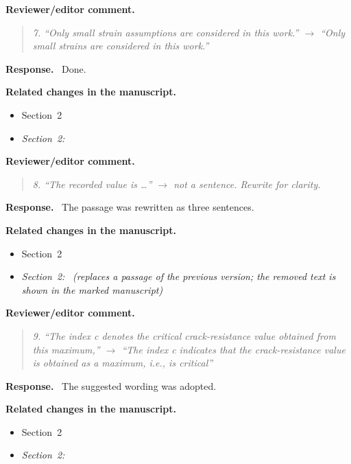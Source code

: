 \documentclass[pdflatex,sn-mathphys-num]{sn-jnl}
\newenvironment{reviewercomment}
  {\par\noindent\textbf{Reviewer/editor comment.}\begin{quote}\itshape}
  {\end{quote}}
\newenvironment{response}
  {\par\noindent\textbf{Response.}\ }
  {\par}
\newenvironment{relatedchanges}
  {\par\noindent\textbf{Related changes in the manuscript.}\begin{itemize}\small}
  {\end{itemize}}
\newcommand{\msloc}[1]{\textit{#1:}\ }
\newcommand{\relhead}[1]{\item[]\vspace*{0.2\baselineskip}#1}
\begin{document}
\begin{reviewercomment}
7. ``Only small strain assumptions are considered in this work.'' $\to$ ``Only small strains are considered in this work.''
\end{reviewercomment}
\begin{response}
Done.
\end{response}
\begin{relatedchanges}
\relhead{Section~2}
\item \msloc{Section~2}
\end{relatedchanges}

\begin{reviewercomment}
8. ``The recorded value is \dots'' $\to$ not a sentence. Rewrite for clarity.
\end{reviewercomment}
\begin{response}
The passage was rewritten as three sentences.
\end{response}
\begin{relatedchanges}
\relhead{Section~2}
\item \msloc{Section~2}
 \textit{(replaces a passage of the previous version; the removed text is shown in the marked manuscript)}
\end{relatedchanges}

\begin{reviewercomment}
9. ``The index c denotes the critical crack-resistance value obtained from this maximum,'' $\to$ ``The index c indicates
that the crack-resistance value is obtained as a maximum, i.e., is \emph{critical}''
\end{reviewercomment}
\begin{response}
The suggested wording was adopted.
\end{response}
\begin{relatedchanges}
\relhead{Section~2}
\item \msloc{Section~2}
\end{relatedchanges}
\end{document}
